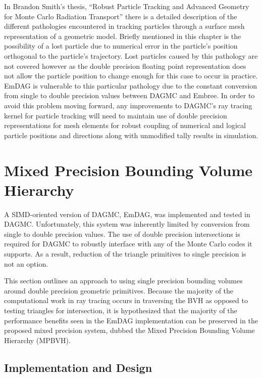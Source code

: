 In Brandon Smith's thesis, ``Robust Particle Tracking and Advanced Geometry for
Monte Carlo Radiation Transport'' \cite{Smith_2011} there is a detailed
description of the different pathologies encountered in tracking particles
through a surface mesh representation of a geometric model. Briefly mentioned in
this chapter is the possibility of a lost particle due to numerical error in the
particle's position orthogonal to the particle's trajectory. Lost particles
caused by this pathology are not covered however as the double precision
floating point representation does not allow the particle position to change
enough for this case to occur in practice. EmDAG is vulnerable to this
particular pathology due to the constant conversion from single to double
precision values between DAGMC and Embree. In order to avoid this problem moving
forward, any improvements to DAGMC's ray tracing kernel for particle tracking
will need to maintain use of double precision representations for mesh elements
for robust coupling of numerical and logical particle positions and directions
along with unmodified tally results in simulation.

\section{Mixed Precision Bounding Volume Hierarchy}\label{sec:MPBVH}

A SIMD-oriented version of DAGMC, EmDAG, was implemented and tested in
DAGMC. Unfortunately, this system was inherently limited by conversion from
single to double precision values. The use of double precision intersections is
required for DAGMC to robustly interface with any of the Monte Carlo codes it
supports. As a result, reduction of the triangle primitives to single precision
is not an option.

This section outlines an approach to using single precision bounding volumes
around double precision geometric primitives. Because the majority of the
computational work in ray tracing occurs in traversing the BVH as opposed to
testing triangles for intersection, it is hypothesized that the majority of the
performance benefits seen in the EmDAG implementation can be preserved in the
proposed mixed precision system, dubbed the Mixed Precision Bounding Volume
Hierarchy (MPBVH).

\subsection{Implementation and Design}

